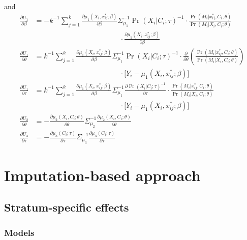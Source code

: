\documentclass[]{article}
\begin{document}
\noindent and
\begin{align*}
\displaystyle \frac{\partial U_1}{\partial \beta} &= - k^{-1} \sum_{j=1}^{k} \frac{\partial \mu_1(X_i,x^*_{ij};\beta)}{\partial \beta} \Sigma_{\mu_1}^{-1} \Pr(X_i\vert C_i;\tau)^{-1} \cdot \frac{\Pr(M_i\vert x^*_{ij},C_i;\theta)}{\Pr(M_i\vert X_i,C_i;\theta)}\\[-0.6em] & \qquad \qquad \qquad \qquad \qquad \qquad \cdot \frac{\partial \mu_1(X_i,x^*_{ij};\beta)}{\partial \beta}\\[0.6em]
\displaystyle \frac{\partial U_1}{\partial \theta} &= k^{-1} \sum_{j=1}^{k} \frac{\partial \mu_1(X_i,x^*_{ij};\beta)}{\partial \beta} \Sigma_{\mu_1}^{-1} \Pr(X_i\vert C_i;\tau)^{-1} \cdot \frac{\partial}{\partial \theta}\left(\frac{\Pr(M_i\vert x^*_{ij},C_i;\theta)}{\Pr(M_i\vert X_i,C_i;\theta)}\right)\\[-0.6em] & \qquad \qquad \qquad \qquad \qquad \qquad \cdot \big[ Y_i - \mu_1(X_i,x^*_{ij};\beta) \big]\\[0.6em]
\displaystyle \frac{\partial U_1}{\partial \tau} &= k^{-1} \sum_{j=1}^{k} \frac{\partial \mu_1(X_i,x^*_{ij};\beta)}{\partial \beta} \Sigma_{\mu_1}^{-1} \frac{\partial \Pr(X_i\vert C_i;\tau)^{-1}}{\partial \tau} \cdot \frac{\Pr(M_i\vert x^*_{ij},C_i;\theta)}{\Pr(M_i\vert X_i,C_i;\theta)}\\[-0.6em] & \qquad \qquad \qquad \qquad \qquad \qquad \cdot \big[ Y_i - \mu_1(X_i,x^*_{ij};\beta) \big]\\[0.6em]
\displaystyle \frac{\partial U_2}{\partial \theta} &= - \frac{\partial \mu_2(X_i,C_i;\theta)}{\partial \theta} \Sigma_{\mu_2}^{-1} \frac{\partial \mu_2(X_i,C_i;\theta)}{\partial \theta}\\[0.6em]
\displaystyle \frac{\partial U_3}{\partial \tau} &= - \frac{\partial \mu_3(C_i;\tau)}{\partial \tau} \Sigma_{\mu_3}^{-1} \frac{\partial \mu_3(C_i;\tau)}{\partial \tau}
\end{align*}

\newpage
\section*{Imputation-based approach}

\subsection*{Stratum-specific effects}

\subsubsection*{Models}
\end{document}
